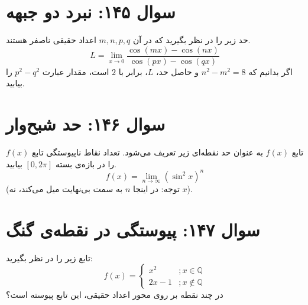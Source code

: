 \documentclass[12pt]{article}
\begin{document}
\section*{سوال ۱۴۵: نبرد دو جبهه}
حد زیر را در نظر بگیرید که در آن \(m, n, p, q\) اعداد حقیقی ناصفر هستند.
\begin{displaymath}
	L = \lim_{x \to 0} \frac{\cos(mx) - \cos(nx)}{\cos(px) - \cos(qx)}
\end{displaymath}
اگر بدانیم که \(n^2-m^2 = 8\) و حاصل حد، \(L\)، برابر با \(2\) است، مقدار عبارت \(p^2-q^2\) را بیابید.

\vspace{1cm}
\hrulefill
\vspace{1cm}

\section*{سوال ۱۴۶: حد شبح‌وار}
تابع \(f(x)\) به عنوان حد نقطه‌ای زیر تعریف می‌شود. تعداد نقاط ناپیوستگی تابع \(f(x)\) را در بازه‌ی بسته \( [0, 2\pi] \) بیابید.
\begin{displaymath}
	f(x) = \lim_{n \to \infty} (\sin^2 x)^n
\end{displaymath}
(توجه: در اینجا \(n\) به سمت بی‌نهایت میل می‌کند، نه \(x\)).

\vspace{1cm}
\hrulefill
\vspace{1cm}

\section*{سوال ۱۴۷: پیوستگی در نقطه‌ی گنگ}
تابع زیر را در نظر بگیرید:
\begin{displaymath}
	f(x) = 
	\begin{cases}
		x^2 & ; x \in \mathbb{Q} \\
		2x-1 & ; x \notin \mathbb{Q}
	\end{cases}
\end{displaymath}
در چند نقطه بر روی محور اعداد حقیقی، این تابع پیوسته است؟
\end{document}

